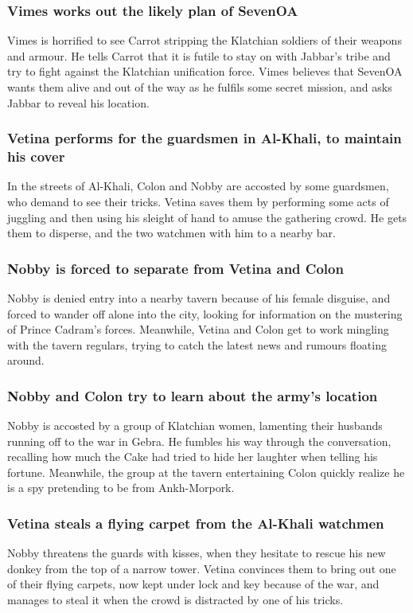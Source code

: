 \subsubsection{\Gls{Vimes} works out the likely plan of \Gls{SevenOA}}
\Gls{Vimes} is horrified to see \Gls{Carrot} stripping the Klatchian soldiers of their weapons and
armour. He tells \Gls{Carrot} that it is futile to stay on with \Gls{Jabbar}'s tribe and try to
fight against the Klatchian unification force. \Gls{Vimes} believes that \Gls{SevenOA} wants them
alive and out of the way as he fulfils some secret mission, and asks \Gls{Jabbar} to reveal his
location.

\subsubsection{\Gls{Vetina} performs for the guardsmen in Al-Khali, to maintain his cover}
In the streets of Al-Khali, \Gls{Colon} and \Gls{Nobby} are accosted by some guardsmen, who demand
to see their tricks. \Gls{Vetina} saves them by performing some acts of juggling and then using
his sleight of hand to amuse the gathering crowd. He gets them to disperse, and the two watchmen
with him to a nearby bar.

\subsubsection{\Gls{Nobby} is forced to separate from \Gls{Vetina} and \Gls{Colon}}
\Gls{Nobby} is denied entry into a nearby tavern because of his female disguise, and forced to
wander off alone into the city, looking for information on the mustering of Prince \Gls{Cadram}'s
forces. Meanwhile, \Gls{Vetina} and \Gls{Colon} get to work mingling with the tavern regulars,
trying to catch the latest news and rumours floating around.

\subsubsection{\Gls{Nobby} and \Gls{Colon} try to learn about the army's location}
\Gls{Nobby} is accosted by a group of Klatchian women, lamenting their husbands running off to the
war in Gebra. He fumbles his way through the conversation, recalling how much the \Gls{Cake} had
tried to hide her laughter when telling his fortune. Meanwhile, the group at the tavern entertaining
\Gls{Colon} quickly realize he is a spy pretending to be from Ankh-Morpork.

\subsubsection{\Gls{Vetina} steals a flying carpet from the Al-Khali watchmen}
\Gls{Nobby} threatens the guards with kisses, when they hesitate to rescue his new donkey from the
top of a narrow tower. \Gls{Vetina} convinces them to bring out one of their flying carpets, now
kept under lock and key because of the war, and manages to steal it when the crowd is distracted by
one of his tricks.

